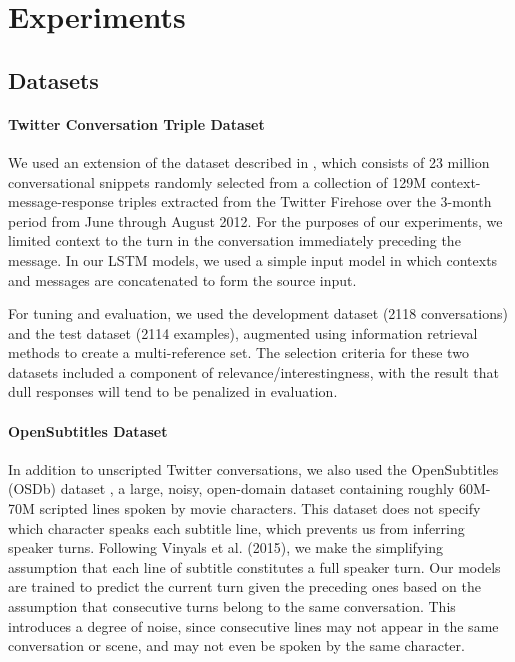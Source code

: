 \section{Experiments}
\subsection{Datasets}
\paragraph{Twitter Conversation Triple Dataset} 
We used an extension of the dataset described in 
, which consists of 23 million conversational snippets randomly selected from a collection of 129M context-message-response triples extracted from the Twitter Firehose over the 3-month period from June through August 2012.
For the purposes of our experiments, we limited context to the turn in the conversation immediately preceding the message. In our LSTM models, we used a simple input model in which contexts and messages are concatenated to form the source input. 

For tuning and evaluation, we used the development dataset (2118 conversations) and the test dataset (2114 examples), augmented using information retrieval methods to create a multi-reference set. 
The selection criteria for these two datasets included a component of relevance/interestingness, with the result that dull responses will tend to be penalized in evaluation.

\paragraph{OpenSubtitles Dataset} In addition to unscripted Twitter conversations, we also used the OpenSubtitles (OSDb) dataset \cite{tiedemann2009news}, a large, noisy, open-domain dataset containing roughly 60M-70M scripted lines spoken by movie characters. 
This dataset does not specify which character speaks each subtitle line, which prevents us from inferring speaker turns. 
Following Vinyals et al. (2015), we make the simplifying assumption that each line of subtitle constitutes a full speaker turn. Our models are trained to predict the current turn given the preceding ones based on the assumption that consecutive turns belong to the same conversation.
This introduces a degree of noise, since consecutive lines may not appear in the same conversation or scene, and may not even be spoken by the same character.

